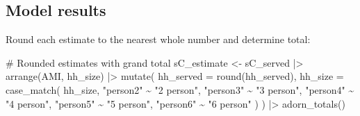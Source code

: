 \documentclass[
  10pt,
  letterpaper,
  DIV=11,
  numbers=noendperiod]{scrartcl}
\newenvironment{Shaded}{\begin{snugshade}}{\end{snugshade}}
\newcommand{\AttributeTok}[1]{\textcolor[rgb]{0.40,0.45,0.13}{#1}}
\newcommand{\CommentTok}[1]{\textcolor[rgb]{0.37,0.37,0.37}{#1}}
\newcommand{\FunctionTok}[1]{\textcolor[rgb]{0.28,0.35,0.67}{#1}}
\newcommand{\NormalTok}[1]{\textcolor[rgb]{0.00,0.23,0.31}{#1}}
\newcommand{\OtherTok}[1]{\textcolor[rgb]{0.00,0.23,0.31}{#1}}
\newcommand{\SpecialCharTok}[1]{\textcolor[rgb]{0.37,0.37,0.37}{#1}}
\newcommand{\StringTok}[1]{\textcolor[rgb]{0.13,0.47,0.30}{#1}}
\begin{document}
\newpage

\subsection{Model results}\label{model-results-2}

Round each estimate to the nearest whole number and determine total:

\begin{Shaded}
\begin{Highlighting}[]
\CommentTok{\# Rounded estimates with grand total}
\NormalTok{sC\_estimate }\OtherTok{\textless{}{-}}\NormalTok{ sC\_served }\SpecialCharTok{|\textgreater{}}
  \FunctionTok{arrange}\NormalTok{(AMI, hh\_size) }\SpecialCharTok{|\textgreater{}} 
  \FunctionTok{mutate}\NormalTok{(}
    \AttributeTok{hh\_served =} \FunctionTok{round}\NormalTok{(hh\_served),}
    \AttributeTok{hh\_size =} \FunctionTok{case\_match}\NormalTok{(}
\NormalTok{      hh\_size,}
      \StringTok{"person2"} \SpecialCharTok{\textasciitilde{}} \StringTok{"2 person"}\NormalTok{,}
      \StringTok{"person3"} \SpecialCharTok{\textasciitilde{}} \StringTok{"3 person"}\NormalTok{,}
      \StringTok{"person4"} \SpecialCharTok{\textasciitilde{}} \StringTok{"4 person"}\NormalTok{,}
      \StringTok{"person5"} \SpecialCharTok{\textasciitilde{}} \StringTok{"5 person"}\NormalTok{,}
      \StringTok{"person6"} \SpecialCharTok{\textasciitilde{}} \StringTok{"6 person"}
\NormalTok{    )}
\NormalTok{  ) }\SpecialCharTok{|\textgreater{}} 
  \FunctionTok{adorn\_totals}\NormalTok{()}
\end{Highlighting}
\end{Shaded}
\end{document}
